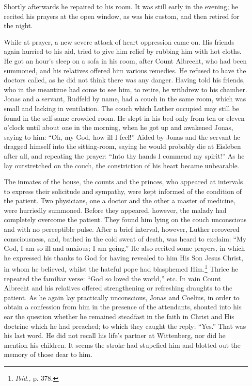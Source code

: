 Shortly afterwards he repaired to his room. It was still early in the
evening; he recited his prayers at the open window, as was his custom,
and then retired for the night.

While at prayer, a new severe attack of heart oppression came on.
His friends again hurried to his aid, tried to give him relief by rubbing
him with hot cloths. He got an hour’s sleep on a sofa in his
room, after Count Albrecht, who had been summoned, and his relatives offered
him various remedies. He refused to have the doctors
called, as he did not think there was any danger. Having told his
friends, who in the meantime had come to see him, to retire, he
withdrew to his chamber. Jonas and a servant, Rudfeld by name,
had a couch in the same room, which was small and lacking in ventilation.
The couch which Luther occupied may still be found in the
self-same crowded room. He slept in his bed only from ten or eleven
o’clock until about one in the morning, when he got up and awakened Jonas,
saying to him: “Oh, my God, how ill I feel!” Aided by
Jonas and the servant he dragged himself into the sitting-room,
saying he would probably die at Eisleben after all, and repeating the
prayer: “Into thy hands I commend my spirit!” As he lay outstretched on
the couch, the constriction of his heart became unbearable.

The inmates of the house, the counts and the princes, who appeared
at intervals to express their solicitude and sympathy, were kept informed
of the condition of the patient. Two physicians, one a doctor
and the other a master of medicine, were hurriedly summoned. Before
they appeared, however, the malady had completely overcome the
patient. They found him lying on the couch unconscious and with
no perceptible pulse. After a brief interval, however, Luther recovered
consciousness, and, bathed in the cold sweat of death, was heard
to exclaim: “My God, I am so ill and anxious; I am going.” He also
recited some prayers, in which he expressed his thanks to God for
having revealed to him His Son Jesus Christ, in whom he believed,
whilst the hateful pope had blasphemed Him.\footnote{\textit{Ibid.}, p. 378.}
Thrice he repeated
the familiar verse: “God so loved the world,” etc. In vain Count Albrecht
and his relatives offered strengthening or refreshing draughts
to the patient. As he again lay practically unconscious, Jonas and
Coelius, in order to obtain a confession from him in the presence of
the attendants, shouted into his ear the question whether he remained
steadfast in the faith in Christ and His doctrine which he had
preached; to which they caught the reply: “Yes.” That was his last
word. He did not recall his life’s partner at Wittenberg, nor did he
mention his children. It seems the stroke had stupefied him and
blotted out the memory of those dear to him.

